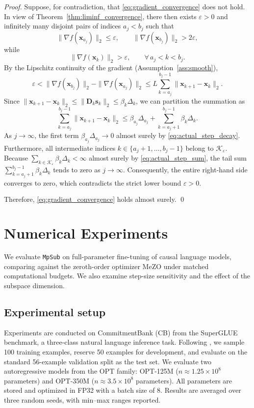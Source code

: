 \documentclass[smallextended]{svjour3}
\newcommand{\bx}{\bm{x}}
\newcommand{\bs}{\bm{s}}
\begin{document}
\begin{proof}
Suppose, for contradiction, that \eqref{eq:gradient_convergence} does not hold. In view of Theorem~\ref{thm:liminf_convergence}, there then exists $\varepsilon>0$ and infinitely many disjoint pairs of indices $a_j < b_j$ such that
\[
\|\nabla f(\bx_{a_j})\|_2 \le \varepsilon, \qquad \|\nabla f(\bx_{b_j})\|_2 > 2\varepsilon,
\]
while
\[
\|\nabla f(\bx_k)\|_2 > \varepsilon, \qquad \forall\, a_j < k < b_j.
\]
By the Lipschitz continuity of the gradient (Assumption~\ref{ass:smooth}),
\[
\varepsilon < \|\nabla f(\bx_{b_j})\|_2 - \|\nabla f(\bx_{a_j})\|_2 \le L \sum_{k=a_j}^{b_j-1} \|\bx_{k+1}-\bx_k\|_2.
\]
Since $\|\bx_{k+1}-\bx_k\|_2 \le \|\bm D_k \bs_k\|_2 \le \beta_k\Delta_k$, we can partition the summation as
\[
\sum_{k=a_j}^{b_j-1} \|\bx_{k+1}-\bx_k\|_2 \le \beta_{a_j}\Delta_{a_j} + \sum_{k=a_j+1}^{b_j-1} \beta_k\Delta_k.
\]
As $j\to\infty$, the first term $\beta_{a_j}\Delta_{a_j} \to 0$ almost surely by \eqref{eq:actual_step_decay}. Furthermore, all intermediate indices $k \in \{a_j+1, \ldots, b_j-1\}$ belong to $\mathcal K_\varepsilon$. Because $\sum_{k\in\mathcal K_\varepsilon} \beta_k\Delta_k < \infty$ almost surely by \eqref{eq:actual_step_sum}, the tail sum $\sum_{k=a_j+1}^{b_j-1} \beta_k\Delta_k$ tends to zero as $j\to\infty$. Consequently, the entire right-hand side converges to zero, which contradicts the strict lower bound $\varepsilon > 0$.

Therefore, \eqref{eq:gradient_convergence} holds almost surely.
\qed
\end{proof}

\section{Numerical Experiments}
\label{sec:experiments}

We evaluate \texttt{MpSub} on full-parameter fine-tuning of causal language models, comparing against the zeroth-order optimizer MeZO \cite{malladi2023mezo} under matched computational budgets. We also examine step-size sensitivity and the effect of the subspace dimension.

\subsection{Experimental setup}
\label{subsec:setup}

Experiments are conducted on CommitmentBank (CB) from the SuperGLUE benchmark, a three-class natural language inference task. Following \cite{malladi2023mezo}, we sample 100 training examples, reserve 50 examples for development, and evaluate on the standard 56-example validation split as the test set. We evaluate two autoregressive models from the OPT family: OPT-125M ($n \approx 1.25 \times 10^8$ parameters) and OPT-350M ($n \approx 3.5 \times 10^8$ parameters). All parameters are stored and optimized in FP32 with a batch size of 8. Results are averaged over three random seeds, with min--max ranges reported.
\end{document}
